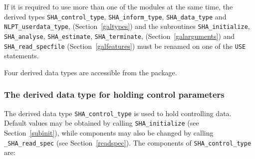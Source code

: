 \documentclass{galahad}
\newcommand{\packagename}{SHA}
\newcommand{\fullpackagename}{\libraryname\_\packagename}
\begin{document}
\noindent
If it is required to use more than one of the modules at the same time,
the derived types
{\tt \packagename\_control\_type},
{\tt \packagename\_inform\_type},
{\tt \packagename\_data\_type}
and
{\tt NLPT\_userdata\_type},
(Section~\ref{galtypes})
and the subroutines
{\tt \packagename\_initialize},
{\tt \packagename\_\-analyse},
{\tt \packagename\_\-estimate},
{\tt \packagename\_terminate},
(Section~\ref{galarguments})
and
{\tt \packagename\_read\_specfile}
(Section~\ref{galfeatures})
must be renamed on one of the {\tt USE} statements.








\galtypes
Four derived data types are accessible from the package.


\subsubsection{The derived data type for holding control
 parameters}\label{typecontrol}
The derived data type
{\tt \packagename\_control\_type}
is used to hold controlling data. Default values may be obtained by calling
{\tt \packagename\_initialize}
(see Section~\ref{subinit}),
while components may also be changed by calling
{\tt \fullpackagename\_read\-\_spec}
(see Section~\ref{readspec}).
The components of
{\tt \packagename\_control\_type}
are:
\end{document}
